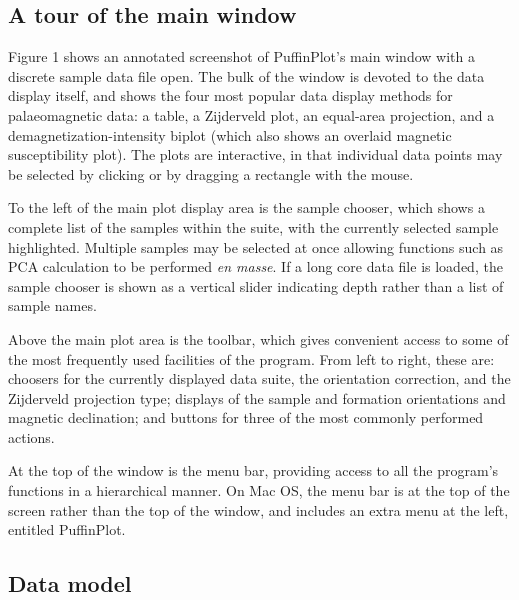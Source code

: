 \documentclass[a4paper,british]{article}
\newcommand{\caps}[1]{\MakeTextUppercase{#1}} %
\begin{document}
\subsection{A tour of the main window}

Figure 1 shows an annotated screenshot of PuffinPlot's main window with
a discrete sample data file open. The bulk of the window is devoted to
the data display itself, and shows the four most popular data display
methods for palaeomagnetic data: a table, a Zijderveld plot, an
equal-area projection, and a demagnetization-intensity biplot (which
also shows an overlaid magnetic susceptibility plot). The plots are
interactive, in that individual data points may be selected by clicking
or by dragging a rectangle with the mouse.

To the left of the main plot display area is the sample chooser, which shows
a complete list of the samples within the suite, with the currently selected
sample highlighted. Multiple samples may be selected at once allowing
functions such as \caps{pca} calculation to be performed \emph{en masse}. If
a long core data file is loaded, the sample chooser is shown as a vertical
slider indicating depth rather than a list of sample names.

Above the main plot area is the toolbar, which gives convenient access
to some of the most frequently used facilities of the program. From left
to right, these are: choosers for the currently displayed data suite,
the orientation correction, and the Zijderveld projection type; displays
of the sample and formation orientations and magnetic declination; and
buttons for three of the most commonly performed actions.

At the top of the window is the menu bar, providing access to all the
program's functions in a hierarchical manner. On Mac OS, the menu bar is
at the top of the screen rather than the top of the window, and includes
an extra menu at the left, entitled \textsf{PuffinPlot}.

\subsection{Data model}
\end{document}
